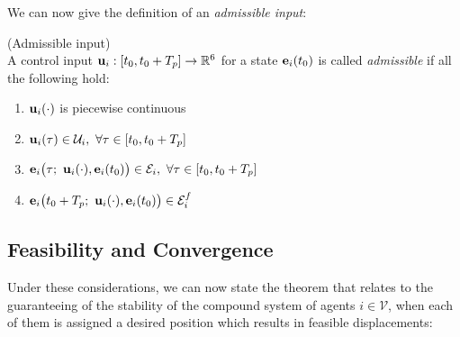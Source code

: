 We can now give the definition of an \textit{admissible input}:

\begin{bw_box}
\begin{definition} (Admissible input)\\

  A control input $\bm{\mathbf{u}}_i : [t_0, t_0 + T_p] \to \mathbb{R}^6$ for a state
  $\bm{\mathbf{e}}_i(t_0)$ is called \textit{admissible} if all the following hold:

  \begin{enumerate}
    \item $\bm{\mathbf{u}}_i(\cdot)$ is piecewise continuous
    \item $\vect{u}_i(\tau) \in \mathcal{U}_i,\ \forall \tau \in [t_0, t_0 + T_p]$
    \item $\vect{e}_i\big(\tau;\ \vect{u}_i(\cdot), \vect{e}_i(t_0)\big) \in \mathcal{E}_i,\ \forall \tau \in [t_0, t_0 + T_p]$
    \item $\vect{e}_i\big(t_0 + T_p;\ \vect{u}_i(\cdot), \vect{e}_i(t_0)\big) \in \mathcal{E}_i^f$
  \end{enumerate}

\end{definition}
\end{bw_box}


\subsection{Feasibility and Convergence}

Under these considerations, we can now state the theorem that relates to
the guaranteeing of the stability of the compound system of agents
$i \in \mathcal{V}$, when each of them is assigned a desired
position which results in feasible displacements:\\


